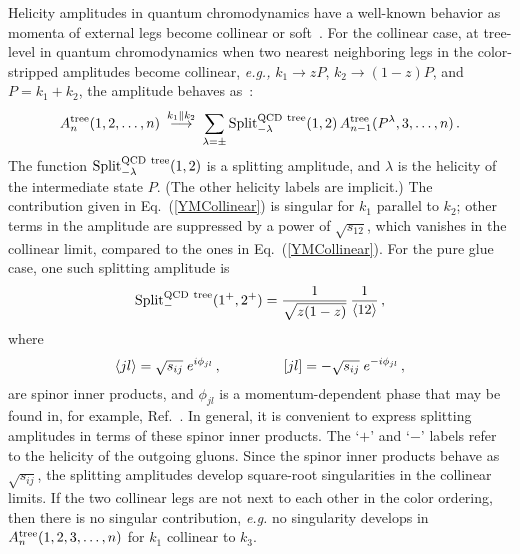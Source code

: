 Helicity amplitudes in quantum chromodynamics have a well-known
behavior as momenta of external legs become collinear or
soft~\cite{ManganoReview,Review}.  For the collinear case, at
tree-level in quantum chromodynamics when two nearest neighboring
legs in the color-stripped amplitudes become collinear, {\it e.g.,} $k_1
\rightarrow z P$, $k_2 \rightarrow (1-z) P$, and $P = k_1 + k_2$, 
the amplitude behaves as~\cite{ManganoReview}:
%
\begin{equation}
A_n^{\rm tree}(1,2,\ldots,n)\ \mathop{\longrightarrow}^{k_1 \parallel k_2}\ 
 \sum_{\lambda = \pm} 
{\mathop{\rm Split}\nolimits}_{-\lambda}^{\rm QCD\ tree}(1,2) \, 
    A_{n-1}^{\rm tree}(P^\lambda,3,\ldots,n)\,.
\label{YMCollinear}
\end{equation}
%
The function ${\mathop{\rm Split}\nolimits}_{-\lambda}^{\rm QCD\
tree}(1,2)$ is a splitting amplitude, and $\lambda$ is the helicity of
the intermediate state $P$.  (The other helicity labels are implicit.)
The contribution given in Eq.~(\ref{YMCollinear}) is singular for
$k_1$ parallel to $k_2$; other terms in the amplitude are suppressed
by a power of $\sqrt{s_{12}}$, which vanishes in the collinear limit, 
compared to the ones in
Eq.~(\ref{YMCollinear}).  For the pure glue case, one such splitting
amplitude is
%
\begin{equation}
{\mathop{\rm Split}\nolimits}_-^{\rm QCD\ tree}(1^+,2^+) 
= {1\over \sqrt{z (1-z)}} \, {1\over \langle {1}{2} \rangle} \,,
\label{YMSplitExample}
\end{equation}
%
where 
%
\begin{equation}
\langle j l \rangle =  
\sqrt{s_{ij}}\; e^{i \phi_{jl}}\,, \, \hskip 1.5 cm 
[j l]  = -\sqrt{s_{ij}}\; e^{-i \phi_{jl}}\,,
\label{SpinorsDefs}
\end{equation}
%
are spinor inner products, and $\phi_{jl}$ is a momentum-dependent
phase that may be found in, for example, Ref.~\cite{ManganoReview}.
In general, it is convenient to express splitting amplitudes in terms
of these spinor inner products. The `$+$' and `$-$' labels refer to
the helicity of the outgoing gluons.  Since the spinor inner products
behave as $\sqrt{s_{ij}}$, the splitting amplitudes develop
square-root singularities in the collinear limits.  If the two
collinear legs are not next to each other in the color ordering, then
there is no singular contribution, {\it e.g.} no singularity develops
in $A_n^{\rm tree}(1,2,3,\ldots,n)$ for $k_1$ collinear to $k_3$.

